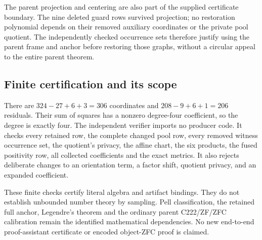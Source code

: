 The parent projection and centering are also part of the supplied
certificate boundary.  The nine deleted guard rows survived projection;
no restoration polynomial depends on their removed auxiliary coordinates
or the private pool quotient.  The independently checked occurrence sets
therefore justify using the parent frame and anchor before restoring those
graphs, without a circular appeal to the entire parent theorem.

\subsection{Finite certification and its scope}

There are $324-27+6+3=306$ coordinates and $208-9+6+1=206$ residuals.
Their sum of squares has a nonzero degree-four coefficient, so the degree
is exactly four.  The independent verifier imports no producer code.  It
checks every retained row, the complete changed pool row, every removed
witness occurrence set, the quotient's privacy, the affine chart, the
six products, the fused positivity row, all collected coefficients and
the exact metrics.  It also rejects deliberate changes to an orientation
term, a factor shift, quotient privacy, and an expanded coefficient.

These finite checks certify literal algebra and artifact bindings.  They
do not establish unbounded number theory by sampling.  Pell classification,
the retained full anchor, Legendre's theorem and the ordinary parent
C222/ZF/ZFC calibration remain the identified mathematical dependencies.
No new end-to-end proof-assistant certificate or encoded object-ZFC proof
is claimed.

